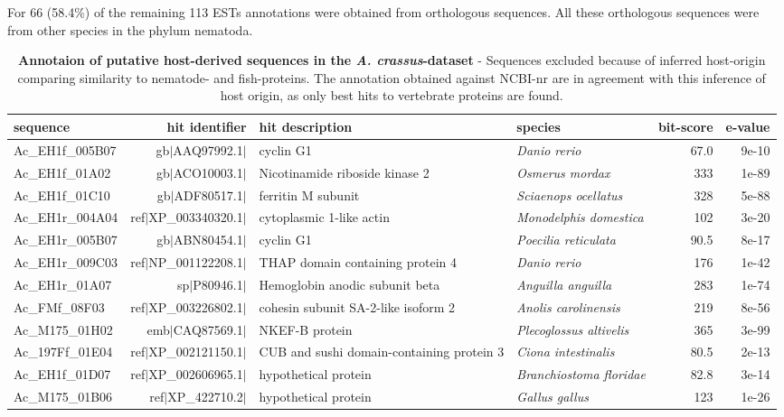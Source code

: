For 66 (58.4\%) of the remaining 113 ESTs annotations were obtained
from orthologous sequences. All these orthologous sequences were from
other species in the phylum nematoda. 

\begin{sidewaystable}[ht]
\begin{center}
\begin{tabular}{lrp{3.5cm}lrr}
  \hline
  sequence & hit identifier & hit description &species & bit-score & e-value \\
  \hline
  Ac\_EH1f\_005B07 & gb$|$AAQ97992.1$|$ & cyclin G1 & \textit{Danio rerio} & 67.0 & 9e-10 \\ 
  Ac\_EH1f\_01A02 & gb$|$ACO10003.1$|$ &  Nicotinamide riboside kinase 2 & \textit{Osmerus mordax} &  333 & 1e-89 \\ 
  Ac\_EH1f\_01C10 & gb$|$ADF80517.1$|$ & ferritin M subunit & \textit{Sciaenops ocellatus}  &  328 & 5e-88 \\ 
  Ac\_EH1r\_004A04 & ref$|$XP\_003340320.1$|$ & cytoplasmic 1-like actin & \textit{Monodelphis domestica}  &  102 &3e-20 \\ 
  Ac\_EH1r\_005B07 & gb$|$ABN80454.1$|$ & cyclin G1  &\textit{Poecilia reticulata}  & 90.5 & 8e-17 \\ 
  Ac\_EH1r\_009C03 & ref$|$NP\_001122208.1$|$ & THAP domain containing protein 4 & \textit{Danio rerio}  &  176 & 1e-42 \\ 
  Ac\_EH1r\_01A07 & sp$|$P80946.1$|$ & Hemoglobin anodic subunit beta &\textit{Anguilla anguilla} & 283 &1e-74 \\ 
  Ac\_FMf\_08F03 & ref$|$XP\_003226802.1$|$ & cohesin subunit SA-2-like isoform 2 & \textit{Anolis carolinensis}  &  219 &8e-56 \\ 
  Ac\_M175\_01H02 & emb$|$CAQ87569.1$|$ & NKEF-B protein & \textit{Plecoglossus altivelis}  &  365 &3e-99 \\ 
  Ac\_197Ff\_01E04 & ref$|$XP\_002121150.1$|$ & CUB and sushi domain-containing protein 3 & \textit{Ciona intestinalis} & 80.5 & 2e-13 \\ 
  Ac\_EH1f\_01D07  & ref$|$XP\_002606965.1$|$ & hypothetical protein & \textit{Branchiostoma floridae} & 82.8 &3e-14 \\ 
  Ac\_M175\_01B06 & ref$|$XP\_422710.2$|$ & hypothetical protein & \textit{Gallus gallus} &  123 &1e-26 \\
  \hline
\end{tabular}
\end{center}
\caption[Annotaion of putative host-derived sequences in the
\textit{A. crassus}-dataset]{\textbf{Annotaion of putative
    host-derived sequences in the \textit{A. crassus}-dataset} -
  Sequences excluded because of inferred host-origin comparing
  similarity to nematode- and fish-proteins. The annotation obtained
  against NCBI-nr are in agreement with this inference of host origin,
  as only best hits to vertebrate proteins are found.}
\label{tab:hostan}
\end{sidewaystable}

     

